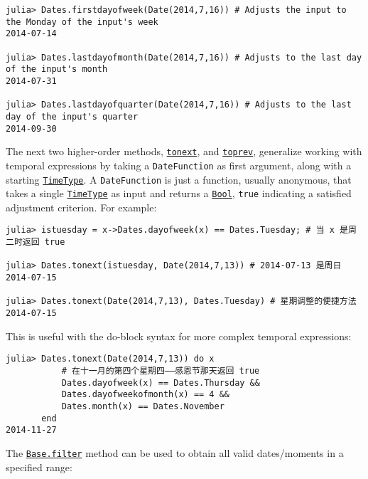 \begin{verbatim}
julia> Dates.firstdayofweek(Date(2014,7,16)) # Adjusts the input to the Monday of the input's week
2014-07-14

julia> Dates.lastdayofmonth(Date(2014,7,16)) # Adjusts to the last day of the input's month
2014-07-31

julia> Dates.lastdayofquarter(Date(2014,7,16)) # Adjusts to the last day of the input's quarter
2014-09-30
\end{verbatim}



The next two higher-order methods, \hyperlink{9410879287453023176}{\texttt{tonext}}, and \hyperlink{5295237512711135506}{\texttt{toprev}}, generalize working with temporal expressions by taking a \texttt{DateFunction} as first argument, along with a starting \hyperlink{4438614350756187528}{\texttt{TimeType}}. A \texttt{DateFunction} is just a function, usually anonymous, that takes a single \hyperlink{4438614350756187528}{\texttt{TimeType}} as input and returns a \hyperlink{46725311238864537}{\texttt{Bool}}, \texttt{true} indicating a satisfied adjustment criterion. For example:




\begin{verbatim}
julia> istuesday = x->Dates.dayofweek(x) == Dates.Tuesday; # 当 x 是周二时返回 true

julia> Dates.tonext(istuesday, Date(2014,7,13)) # 2014-07-13 是周日
2014-07-15

julia> Dates.tonext(Date(2014,7,13), Dates.Tuesday) # 星期调整的便捷方法
2014-07-15
\end{verbatim}



This is useful with the do-block syntax for more complex temporal expressions:




\begin{verbatim}
julia> Dates.tonext(Date(2014,7,13)) do x
           # 在十一月的第四个星期四——感恩节那天返回 true
           Dates.dayofweek(x) == Dates.Thursday &&
           Dates.dayofweekofmonth(x) == 4 &&
           Dates.month(x) == Dates.November
       end
2014-11-27
\end{verbatim}



The \hyperlink{11445961893478569145}{\texttt{Base.filter}} method can be used to obtain all valid dates/moments in a specified range:




